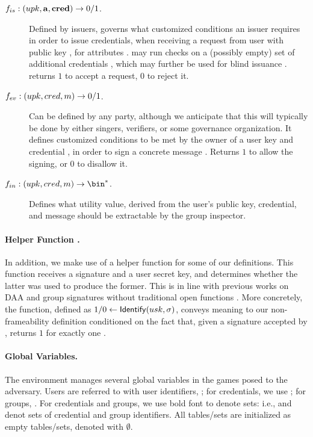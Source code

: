 \begin{description}
\item[$f_{is}: (upk, \mathbf{a},\mathbf{cred}) \rightarrow 0/1$.] Defined by issuers,
  governs what customized conditions an issuer requires in order to issue
  credentials, when receiving a request from user with public key \upk, for
  attributes \attrs. \fissue may run checks on a (possibly empty) set of
  additional credentials \scred, which may further be used for blind issuance
  . \fissue returns $1$ to accept a request, $0$ to
  reject it.  
\item[$f_{ev}: (upk,cred,m) \rightarrow 0/1$.] Can be defined by any party,
  although we anticipate that this will typically be done by either singers,
  verifiers, or some governance organization. It defines customized conditions
  to be met by the owner of a user key \upk and credential \cred, in
  order to sign a concrete message \msg. Returns $1$ to allow the signing,
  or $0$ to disallow it.
\item[$\finsp: (\upk,\cred,\msg) \rightarrow \bin^*$.] Defines what
  utility value, derived from the user's public key, credential, and message
  should be extractable by the group inspector.
\end{description}

\paragraph{Helper Function \Identify.} In addition, we make use of a helper
function \Identify for some of our definitions. This function receives
a signature and a user secret key, and determines whether the latter was used
to produce the former. This is in line with previous works on DAA
\cite{bfg+11,cdl16} and group signatures without traditional open functions
\cite{dl21,fgl21,gl19}. More concretely, the \Identify function, defined as $1/0
\gets \mathsf{Identify}(usk,\sigma)$, conveys meaning to our non-frameability definition
conditioned on the fact that, given a signature \sig accepted by \Verify,
\Identify returns $1$ for exactly one \usk.

\paragraph{Global Variables.} %
The environment manages several global variables in the games posed to the
adversary. Users are referred to with user identifiers, \uid; for credentials,
we use \cid; for groups, \gid. For credentials and groups, we use bold font to
denote sets: i.e., \scid and \sgid denot sets of credential and group
identifiers. All tables/sets are initialized as empty tables/sets, denoted
with $\emptyset$.

